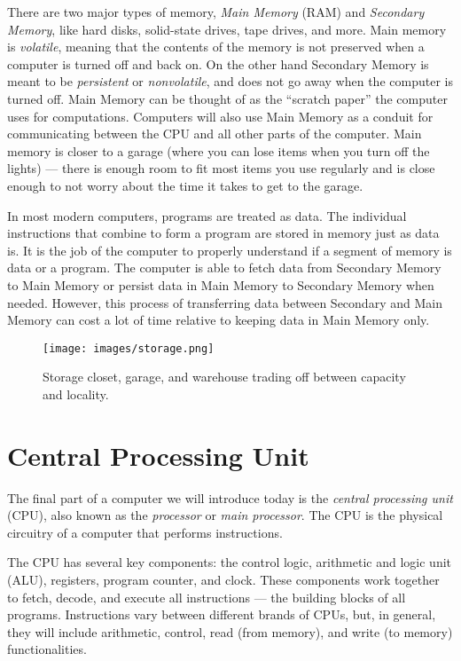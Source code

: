 There are two major types of memory, \emph{Main Memory} (RAM) and \emph{Secondary Memory},
like hard disks, solid-state drives, tape drives, and more. Main memory is \emph{volatile},
meaning that the contents of the memory is not preserved when a computer is
turned off and back on. On the other hand Secondary Memory is meant to be
\emph{persistent} or \emph{nonvolatile}, and does not go away when the computer is turned off. Main Memory
can be thought of as the ``scratch paper'' the computer uses for computations.
Computers will also use Main Memory as a conduit for communicating between the
CPU and all other parts of the computer. Main memory is closer to a garage
(where you can lose items when you turn off the lights) --- there is enough room
to fit most items you use regularly and is close enough to not worry about the
time it takes to get to the garage.

In most modern computers,
programs are treated as data. The individual instructions that combine
to form a program are stored in memory just as data is. It is the job of the
computer to properly understand if a segment of memory is data or a program.
The computer is able to fetch data from Secondary Memory to Main Memory or
persist data in Main Memory to Secondary Memory when needed. However,
this process of transferring data between Secondary and Main Memory can
cost a lot of time relative to keeping data in Main Memory only.

\begin{figure}
	\centering
	\texttt{[image: images/storage.png]}
	\caption{Storage closet, garage, and warehouse trading off between
                 capacity and locality. }
	\label{fig:hardware:storage}
\end{figure}

\section {Central Processing Unit}

The final part of a computer we will introduce today is the \emph{central processing
unit} (CPU), also known as the \emph{processor} or \emph{main processor}. The CPU is the physical
circuitry of a computer that performs instructions.

The CPU has several key components: the control logic, arithmetic and logic unit (ALU), registers,
program counter, and clock. These components work together to 
fetch, decode, and execute all instructions --- the building blocks of all programs.
Instructions vary between different brands of CPUs, but, in general, they will
include arithmetic, control, read (from memory), and write (to memory) functionalities.


